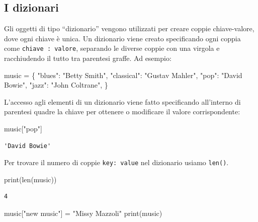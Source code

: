 \documentclass[
  letterpaper,
  krantz2]{{[}./krantz{]}}
\newenvironment{Shaded}{\begin{snugshade}}{\end{snugshade}}
\newcommand{\BuiltInTok}[1]{\textcolor[rgb]{0.00,0.23,0.31}{#1}}
\newcommand{\NormalTok}[1]{\textcolor[rgb]{0.00,0.23,0.31}{#1}}
\newcommand{\OperatorTok}[1]{\textcolor[rgb]{0.37,0.37,0.37}{#1}}
\newcommand{\StringTok}[1]{\textcolor[rgb]{0.13,0.47,0.30}{#1}}
\begin{document}
\subsection{I dizionari}\label{i-dizionari}

Gli oggetti di tipo ``dizionario'' vengono utilizzati per creare coppie
chiave-valore, dove ogni chiave è unica. Un dizionario viene creato
specificando ogni coppia come \texttt{chiave\ :\ valore}, separando le
diverse coppie con una virgola e racchiudendo il tutto tra parentesi
graffe. Ad esempio:

\begin{Shaded}
\begin{Highlighting}[]
\NormalTok{music }\OperatorTok{=}\NormalTok{ \{}
    \StringTok{"blues"}\NormalTok{: }\StringTok{"Betty Smith"}\NormalTok{,}
    \StringTok{"classical"}\NormalTok{: }\StringTok{"Gustav Mahler"}\NormalTok{,}
    \StringTok{"pop"}\NormalTok{: }\StringTok{"David Bowie"}\NormalTok{,}
    \StringTok{"jazz"}\NormalTok{: }\StringTok{"John Coltrane"}\NormalTok{,}
\NormalTok{\}}
\end{Highlighting}
\end{Shaded}

L'accesso agli elementi di un dizionario viene fatto specificando
all'interno di parentesi quadre la chiave per ottenere o modificare il
valore corrispondente:

\begin{Shaded}
\begin{Highlighting}[]
\NormalTok{music[}\StringTok{"pop"}\NormalTok{]}
\end{Highlighting}
\end{Shaded}

\begin{verbatim}
'David Bowie'
\end{verbatim}

Per trovare il numero di coppie \texttt{key:\ value} nel dizionario
usiamo \texttt{len()}.

\begin{Shaded}
\begin{Highlighting}[]
\BuiltInTok{print}\NormalTok{(}\BuiltInTok{len}\NormalTok{(music))}
\end{Highlighting}
\end{Shaded}

\begin{verbatim}
4
\end{verbatim}

\begin{Shaded}
\begin{Highlighting}[]
\NormalTok{music[}\StringTok{"new music"}\NormalTok{] }\OperatorTok{=} \StringTok{"Missy Mazzoli"}
\BuiltInTok{print}\NormalTok{(music)}
\end{Highlighting}
\end{Shaded}
\end{document}
